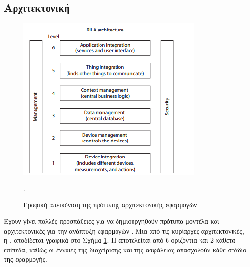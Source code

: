 \subsection{Αρχιτεκτονική}
\begin{figure}[h!]
\includegraphics[scale=1.5]{images/iotrm3.png}
\centering
\caption{Γραφική απεικόνιση της πρότυπης αρχιτεκτονικής  εφαρμογών \cite{iotrm}}.
\label{iotrm}
\end{figure}
Έχουν γίνει πολλές προσπάθειες για να δημιουργηθούν πρότυπα μοντέλα και αρχιτεκτονικές για την ανάπτυξη εφαρμογών .
Μια από τις κυρίαρχες αρχιτεκτονικές, η , αποδίδεται γραφικά στο Σχήμα \ref{iotrm}.
Η  αποτελείται από 6 οριζόντια και 2 κάθετα επίπεδα, καθώς οι έννοιες της διαχείρισης και της ασφάλειας απασχολούν κάθε στάδιο της εφαρμογής.

